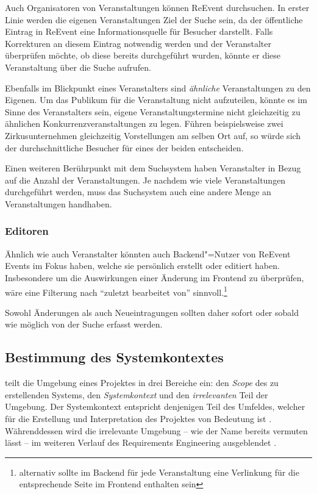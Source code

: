 Auch Organisatoren von Veranstaltungen können ReEvent durchsuchen. In erster Linie werden die eigenen Veranstaltungen Ziel der Suche sein, da der öffentliche Eintrag in ReEvent eine Informationsquelle für Besucher darstellt. Falls Korrekturen an diesem Eintrag notwendig werden und der Veranstalter überprüfen möchte, ob diese bereits durchgeführt wurden, könnte er diese Veranstaltung über die Suche aufrufen.

Ebenfalls im Blickpunkt eines Veranstalters sind \emph{ähnliche} Veranstaltungen zu den Eigenen. Um das Publikum für die Veranstaltung nicht aufzuteilen, könnte es im Sinne des Veranstalters sein, eigene Veranstaltungstermine nicht gleichzeitig zu ähnlichen Konkurrenzveranstaltungen zu legen. Führen beispielsweise zwei Zirkusunternehmen gleichzeitig Vorstellungen am selben Ort auf, so würde sich der durchschnittliche Besucher für eines der beiden entscheiden.

Einen weiteren Berührpunkt mit dem Suchsystem haben Veranstalter in Bezug auf die Anzahl der Veranstaltungen. Je nachdem wie viele Veranstaltungen durchgeführt werden, muss das Suchsystem auch eine andere Menge an Veranstaltungen handhaben.

\subsubsection{Editoren}

Ähnlich wie auch Veranstalter könnten auch Backend"=Nutzer von ReEvent Events im Fokus haben, welche sie persönlich erstellt oder editiert haben. Insbesondere um die Auswirkungen einer Änderung im Frontend zu überprüfen, wäre eine Filterung nach \enquote{zuletzt bearbeitet von} sinnvoll.\footnote{alternativ sollte im Backend für jede Veranstaltung eine Verlinkung für die entsprechende Seite im Frontend enthalten sein}

Sowohl Änderungen als auch Neueintragungen sollten daher sofort oder sobald wie möglich von der Suche erfasst werden.


\subsection{Bestimmung des Systemkontextes}

\cite[S. 85-87]{Rupp.2014} teilt die Umgebung eines Projektes in drei Bereiche ein: den \emph{Scope} des zu erstellenden Systems, den \emph{Systemkontext} und den \emph{irrelevanten} Teil der Umgebung. Der Systemkontext entspricht denjenigen Teil des Umfeldes, welcher für die Erstellung und Interpretation des Projektes von Bedeutung ist \cite[S. 55]{Pohl.2008}. Währenddessen wird die irrelevante Umgebung -- wie der Name bereits vermuten lässt -- im weiteren Verlauf des Requirements Engineering ausgeblendet \cite[S. 462]{Balzert.2009}.


